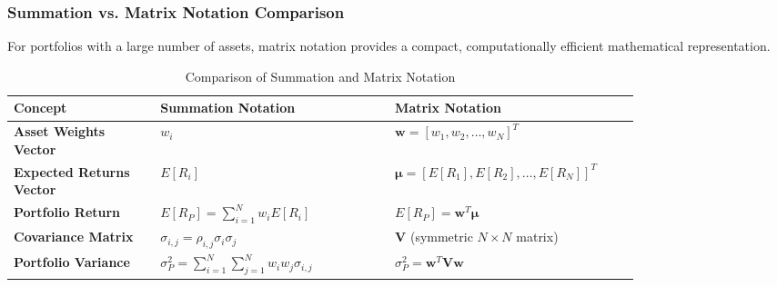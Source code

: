 \subsubsection{Summation vs. Matrix Notation Comparison}
For portfolios with a large number of assets, matrix notation provides a compact, computationally efficient mathematical representation.
\begin{table}[!htbp]
\centering
\renewcommand{\arraystretch}{1.5}
\caption{Comparison of Summation and Matrix Notation}
\label{tab:summation_matrix_comparison_m8}
\begin{tabular}{p{0.20\linewidth}  p{0.32\linewidth}  p{0.28\linewidth}}
	\toprule
	\textbf{Concept} & \textbf{Summation Notation} & \textbf{Matrix Notation} \\
	\midrule
	\textbf{Asset Weights Vector} & $w_i$ & $\mathbf{w} = [w_1, w_2, \dots, w_N]^T$ \\
	\midrule
	\textbf{Expected Returns Vector} & $E[R_i]$ & $\boldsymbol{\mu} = [E[R_1], E[R_2], \dots, E[R_N]]^T$ \\
	\midrule
	\textbf{Portfolio Return} & $E[R_P] = \sum_{i=1}^N w_i E[R_i]$ & $E[R_P] = \mathbf{w}^T \boldsymbol{\mu}$ \\
	\midrule
	\textbf{Covariance Matrix} & $\sigma_{i,j} = \rho_{i,j}\sigma_i\sigma_j$ & $\mathbf{V}$ (symmetric $N \times N$ matrix) \\
	\midrule
	\textbf{Portfolio Variance} & $\sigma_P^2 = \sum_{i=1}^N \sum_{j=1}^N w_i w_j \sigma_{i,j}$ & $\sigma_P^2 = \mathbf{w}^T \mathbf{V} \mathbf{w}$ \\
	\bottomrule
\end{tabular}
\end{table}
